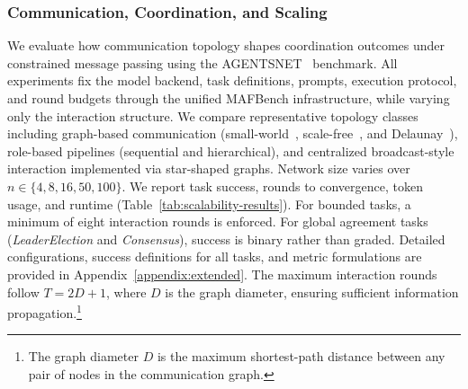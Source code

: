  



% 



\vspace{-2mm}
\subsubsection{Communication, Coordination, and Scaling}
\label{sec:Coordination_section}

We evaluate how communication topology shapes coordination outcomes under constrained message passing using the AGENTSNET~\cite{coordinationcollaborativereasoning} benchmark. All experiments fix the model backend, task definitions, prompts, execution protocol, and round budgets through the unified MAFBench infrastructure, while varying only the interaction structure. We compare representative topology classes including graph-based communication (small-world~\cite{watts1998collective}, scale-free~\cite{scale_free}, and Delaunay~\cite{delaunay}), role-based pipelines (sequential and hierarchical), and centralized broadcast-style interaction implemented via star-shaped graphs. Network size varies over \(n \in \{4, 8, 16, 50, 100\}\). We report task success, rounds to convergence, token usage, and runtime (Table~\ref{tab:scalability-results}). For bounded tasks, a minimum of eight interaction rounds is enforced. For global agreement tasks (\emph{LeaderElection} and \emph{Consensus}), success is binary rather than graded. Detailed configurations, success definitions for all tasks, and metric formulations are provided in Appendix~\ref{appendix:extended}. The maximum interaction rounds follow \(T = 2D + 1\), where \(D\) is the graph diameter, ensuring sufficient information propagation.\footnote{The graph diameter \(D\) is the maximum shortest-path distance between any pair of nodes in the communication graph.}


